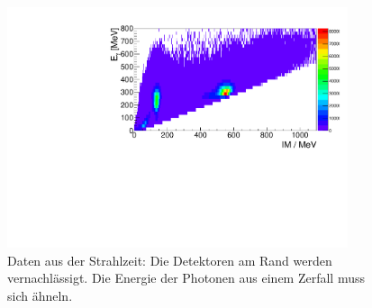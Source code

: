 \documentclass[a4paper,11pt,oneside,final,german,openbib,pdftex]{scrbook}
\begin{document}
{\begin{appendix}

\begin{figure}[h!]
	\begin{center}
		\includegraphics[width=100mm]{NewCalib/Strahlzeit2014/20171904Real30DegreeCutHist}
		\caption[Strahlzeit: 2D-Hist ohne Detektoren am Rand]{Daten aus der Strahlzeit: Die Detektoren am Rand werden vernachl\"assigt. Die Energie der Photonen aus einem Zerfall muss sich \"ahneln.}
		\label{fig:30-Degree-Cut-Histogramm}
	\end{center}
\end{figure}



\end{appendix}}
\end{document}
